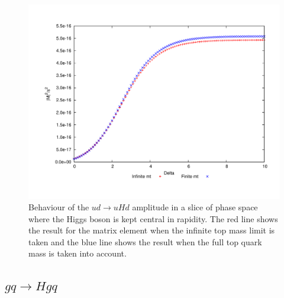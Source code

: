 \begin{figure}[t]
\centering
\includegraphics[scale=0.5]{Images/qQ_qHQ_comp.pdf}
\caption{Behaviour of the $ud \to uHd$ amplitude in a slice of phase space where the Higgs boson is kept central in rapidity. The red line shows the result for the matrix element when the infinite top mass limit is taken and the blue line shows the result when the full top quark mass is taken into account.}
\label{fig:qHQ_comp}
\end{figure}

\subsection{$gq \to Hgq$}

